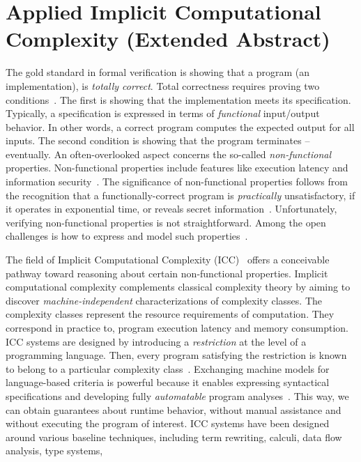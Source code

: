 \section{Applied Implicit Computational Complexity (Extended Abstract)}

The gold standard in formal verification is showing that a program (\ie an implementation), is \emph{totally correct}.
Total correctness requires proving two conditions~\cite{leino2023}.
The first is showing that the implementation meets its specification.
Typically, a specification is expressed in terms of \emph{functional} input/output behavior.
In other words, a correct program computes the expected output for all inputs.
The second condition is showing that the program terminates -- {eventually}.
An often-overlooked aspect concerns the so-called \emph{non-functional} properties.
Non-functional properties include features like execution latency and information security~\cite{terbeek2018}.
The significance of non-functional properties follows from the recognition that a functionally-correct program is \emph{practically} unsatisfactory,
if it operates in exponential time, or reveals secret information~\cite{heraud2011,aubert20222}.
Unfortunately, verifying non-functional properties is not straightforward.
Among the open challenges is how to express and model such properties~\cite{etaps2025}.

The field of {Implicit Computational Complexity (ICC)}~\cite{dallago2011} offers a conceivable pathway toward reasoning about certain non-functional properties.
Implicit computational complexity complements classical complexity theory by aiming to discover \emph{machine-independent} characterizations of complexity classes.
The complexity classes represent the resource requirements of computation.
They correspond in practice to, \eg program execution latency and memory consumption.
ICC systems are designed by introducing a \emph{restriction} at the level of a programming language.
Then, every program satisfying the restriction is known to belong to a particular complexity class~\cite{pchoux2020}.
Exchanging machine models for language-based criteria is powerful because it enables expressing syntactical specifications and developing fully \emph{automatable} program analyses~\cite{heraud2011}.
This way, we can obtain {guarantees} about runtime behavior, without manual assistance and without executing the program of interest.
ICC systems have been designed around various baseline techniques, including term rewriting, calculi, data flow analysis, type systems, \etc~\cite{baillot2012,moyen2017}

